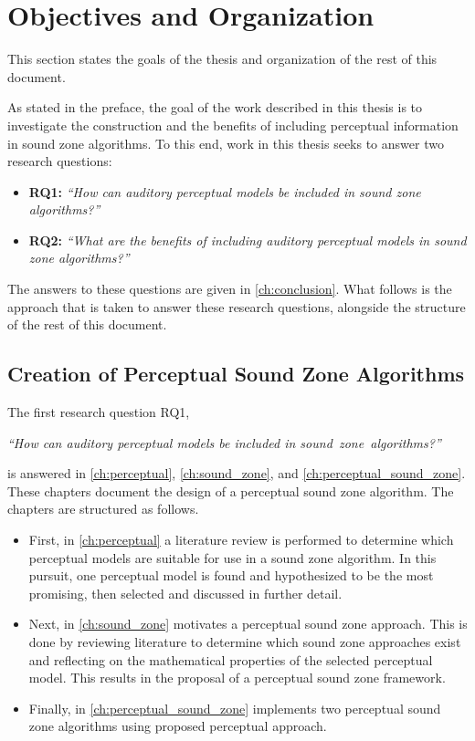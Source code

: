 \section{Objectives and Organization}
\label{ch:introduction:objectives}
This section states the goals of the thesis and organization of the rest of this document.

As stated in the preface, the goal of the work described in this thesis is to investigate the construction and 
the benefits of including perceptual information in sound zone algorithms.
To this end, work in this thesis seeks to answer two research questions:
\begin{itemize}
    \item \textbf{RQ1:} {\textit{``How can auditory perceptual models be included in sound zone algorithms?''}}
    \item \textbf{RQ2:} {\textit{``What are the benefits of including auditory perceptual models in sound zone algorithms?''}}
\end{itemize}

The answers to these questions are given in \autoref{ch:conclusion}. 
What follows is the approach that is taken to answer these research questions, alongside the structure of the rest of this document.

\subsection{Creation of Perceptual Sound Zone Algorithms}
The first research question RQ1, 

\begin{center}
    {\textit{``How can auditory perceptual models be included in sound~zone~algorithms?''}}
\end{center}

is answered in \autoref{ch:perceptual}, \autoref{ch:sound_zone}, and \autoref{ch:perceptual_sound_zone}.
These chapters document the design of a perceptual sound zone algorithm.
The chapters are structured as follows.
\begin{itemize}
    \item First, in \autoref{ch:perceptual} a literature review is performed to determine which perceptual models are suitable for use in a 
        sound zone algorithm.
        In this pursuit, one perceptual model is found and hypothesized to be the most promising, then selected and discussed in further detail.
    \item Next, in \autoref{ch:sound_zone} motivates a perceptual sound zone approach.
        This is done by reviewing literature to determine which sound zone approaches exist 
        and reflecting on the mathematical properties of the selected perceptual model.
        This results in the proposal of a perceptual sound zone framework.
    \item Finally, in \autoref{ch:perceptual_sound_zone} implements two perceptual sound zone algorithms using proposed perceptual approach.
\end{itemize}

